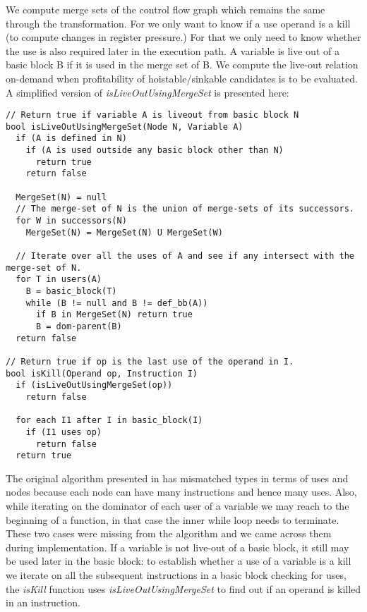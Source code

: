 \documentclass[acmlarge,review,anonymous]{acmart}\settopmatter{printfolios=true}
\begin{document}
We compute merge sets of the control flow graph which remains the same through
the \gcm{} transformation. For \gcm{} we only want to know if a use
operand is a kill (to compute changes in register pressure.) For that we only
need to know whether the use is also required later in the execution path. A
variable is live out of a basic block B if it is used in the merge set of B. We
compute the live-out relation on-demand when profitability of hoistable/sinkable
candidates is to be evaluated. A simplified version of
\emph{isLiveOutUsingMergeSet} is presented here:

\begin{verbatim}
// Return true if variable A is liveout from basic block N
bool isLiveOutUsingMergeSet(Node N, Variable A)
  if (A is defined in N)
    if (A is used outside any basic block other than N)
      return true
    return false

  MergeSet(N) = null
  // The merge-set of N is the union of merge-sets of its successors.
  for W in successors(N)
    MergeSet(N) = MergeSet(N) U MergeSet(W)

  // Iterate over all the uses of A and see if any intersect with the merge-set of N.
  for T in users(A)
    B = basic_block(T)
    while (B != null and B != def_bb(A))
      if B in MergeSet(N) return true
      B = dom-parent(B)
  return false

// Return true if op is the last use of the operand in I.
bool isKill(Operand op, Instruction I)
  if (isLiveOutUsingMergeSet(op))
    return false

  for each I1 after I in basic_block(I)
    if (I1 uses op)
      return false
  return true
\end{verbatim}

The original algorithm presented in \cite{das2012} has mismatched types in terms
of uses and nodes because each node can have many instructions and hence many
uses. Also, while iterating on the dominator of each user of a variable we may
reach to the beginning of a function, in that case the inner while loop needs to
terminate. These two cases were missing from the algorithm and we came across
them during implementation. If a variable is not live-out of a basic block, it
still may be used later in the basic block: to establish whether a use of a
variable is a kill we iterate on all the subsequent instructions in a basic
block checking for uses, the \emph{isKill} function uses
\emph{isLiveOutUsingMergeSet} to find out if an operand is killed in an
instruction.
\end{document}
